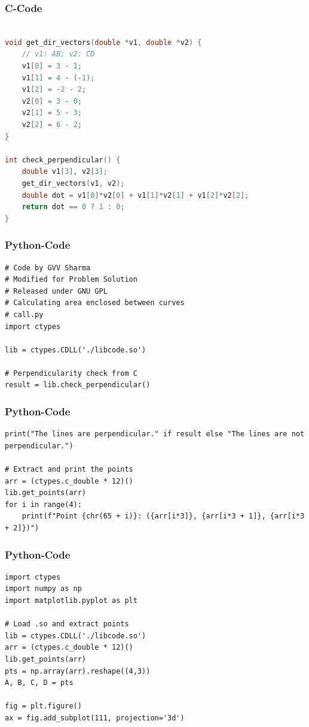 \documentclass{beamer}
\begin{document}
\begin{frame}[fragile]
\frametitle{C-Code}
\begin{lstlisting}[language=C]

void get_dir_vectors(double *v1, double *v2) {
    // v1: AB; v2: CD
    v1[0] = 3 - 1;
    v1[1] = 4 - (-1);
    v1[2] = -2 - 2;
    v2[0] = 3 - 0;
    v2[1] = 5 - 3;
    v2[2] = 6 - 2;
}

int check_perpendicular() {
    double v1[3], v2[3];
    get_dir_vectors(v1, v2);
    double dot = v1[0]*v2[0] + v1[1]*v2[1] + v1[2]*v2[2];
    return dot == 0 ? 1 : 0;
}


 \end{lstlisting}
\end{frame}
\begin{frame}[fragile]
\frametitle{Python-Code}
\begin{lstlisting}
# Code by GVV Sharma
# Modified for Problem Solution
# Released under GNU GPL
# Calculating area enclosed between curves
# call.py
import ctypes

lib = ctypes.CDLL('./libcode.so')

# Perpendicularity check from C
result = lib.check_perpendicular()

\end{lstlisting}
\end{frame}

\begin{frame}[fragile]
\frametitle{Python-Code}
\begin{lstlisting}
print("The lines are perpendicular." if result else "The lines are not perpendicular.")

# Extract and print the points
arr = (ctypes.c_double * 12)()
lib.get_points(arr)
for i in range(4):
    print(f"Point {chr(65 + i)}: ({arr[i*3]}, {arr[i*3 + 1]}, {arr[i*3 + 2]})")

\end{lstlisting}
\end{frame}

\begin{frame}[fragile]
\frametitle{Python-Code}
\begin{lstlisting}
import ctypes
import numpy as np
import matplotlib.pyplot as plt

# Load .so and extract points
lib = ctypes.CDLL('./libcode.so')
arr = (ctypes.c_double * 12)()
lib.get_points(arr)
pts = np.array(arr).reshape((4,3))
A, B, C, D = pts

fig = plt.figure()
ax = fig.add_subplot(111, projection='3d')


\end{lstlisting}
\end{frame}
\end{document}
